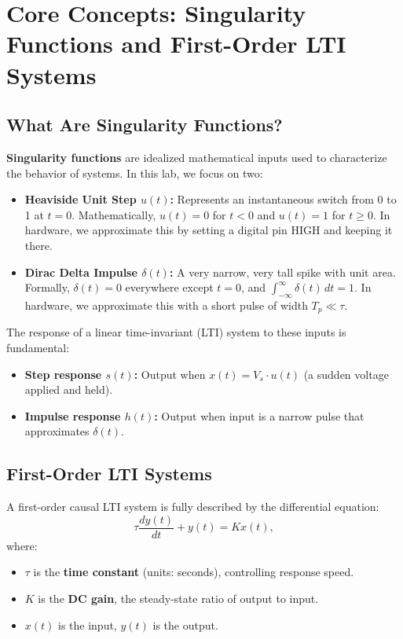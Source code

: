 \documentclass[11pt,letterpaper]{article}
\begin{document}
\clearpage

\section{Core Concepts: Singularity Functions and First-Order LTI Systems}

\subsection{What Are Singularity Functions?}

\textbf{Singularity functions} are idealized mathematical inputs used to characterize the behavior of systems. In this lab, we focus on two:

\begin{itemize}
    \item \textbf{Heaviside Unit Step $u(t)$:} Represents an instantaneous switch from 0 to 1 at $t=0$. Mathematically, $u(t) = 0$ for $t < 0$ and $u(t) = 1$ for $t \ge 0$. In hardware, we approximate this by setting a digital pin HIGH and keeping it there.

    \item \textbf{Dirac Delta Impulse $\delta(t)$:} A very narrow, very tall spike with unit area. Formally, $\delta(t) = 0$ everywhere except $t=0$, and $\int_{-\infty}^{\infty} \delta(t) \, dt = 1$. In hardware, we approximate this with a short pulse of width $T_p \ll \tau$.
\end{itemize}

\noindent
The response of a linear time-invariant (LTI) system to these inputs is fundamental:
\begin{itemize}
    \item \textbf{Step response $s(t)$:} Output when $x(t) = V_s \cdot u(t)$ (a sudden voltage applied and held).
    \item \textbf{Impulse response $h(t)$:} Output when input is a narrow pulse that approximates $\delta(t)$.
\end{itemize}

\subsection{First-Order LTI Systems}

A first-order causal LTI system is fully described by the differential equation:
\begin{equation}
\tau \frac{dy(t)}{dt} + y(t) = K x(t),
\label{eq:firstorder}
\end{equation}
where:
\begin{itemize}
    \item $\tau$ is the \textbf{time constant} (units: seconds), controlling response speed.
    \item $K$ is the \textbf{DC gain}, the steady-state ratio of output to input.
    \item $x(t)$ is the input, $y(t)$ is the output.
\end{itemize}
\end{document}
